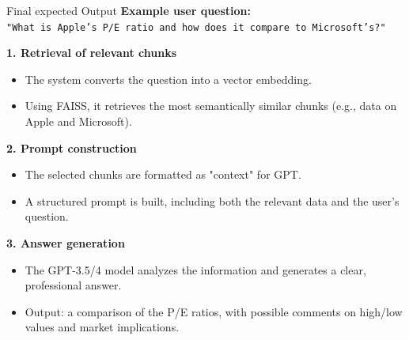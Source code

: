 \documentclass[aspectratio=169,xcolor=dvipsnames]{beamer}
\begin{document}
\begin{frame}{Final expected Output}
  \textbf{Example user question:} \\
  \texttt{"What is Apple's P/E ratio and how does it compare to Microsoft's?"}
  
  \vspace{0.4cm}
  \textbf{1. Retrieval of relevant chunks}
  \begin{itemize}
      \item The system converts the question into a vector embedding.
      \item Using FAISS, it retrieves the most semantically similar chunks (e.g., data on Apple and Microsoft).
  \end{itemize}
  
  \vspace{0.2cm}
  \textbf{2. Prompt construction}
  \begin{itemize}
      \item The selected chunks are formatted as "context" for GPT.
      \item A structured prompt is built, including both the relevant data and the user's question.
  \end{itemize}
  
  \vspace{0.2cm}
  \textbf{3. Answer generation}
  \begin{itemize}
      \item The GPT-3.5/4 model analyzes the information and generates a clear, professional answer.
      \item Output: a comparison of the P/E ratios, with possible comments on high/low values and market implications.
  \end{itemize}
\end{frame}
  
\end{document}
